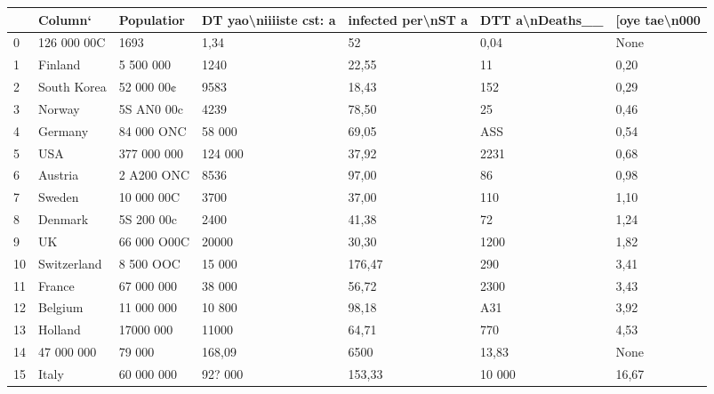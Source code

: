\begin{tabular}{lllllll}
\toprule
{} &      Column‘ &   Populatior & DT yao\textbackslash niiiiste cst: a & infected per\textbackslash nST a & DTT a\textbackslash nDeaths\_\_ & [oye tae\textbackslash n000 \\
\midrule
0  &  126 000 00C &         1693 &                   1,34 &                 52 &            0,04 &          None \\
1  &      Finland &    5 500 000 &                   1240 &              22,55 &              11 &          0,20 \\
2  &  South Korea &   52 000 00¢ &                   9583 &              18,43 &             152 &          0,29 \\
3  &       Norway &   5S AN0 00c &                   4239 &              78,50 &              25 &          0,46 \\
4  &      Germany &   84 000 ONC &                 58 000 &              69,05 &             ASS &          0,54 \\
5  &          USA &  377 000 000 &                124 000 &              37,92 &            2231 &          0,68 \\
6  &      Austria &   2 A200 ONC &                   8536 &              97,00 &              86 &          0,98 \\
7  &       Sweden &   10 000 00C &                   3700 &              37,00 &             110 &          1,10 \\
8  &      Denmark &   5S 200 00c &                   2400 &              41,38 &              72 &          1,24 \\
9  &           UK &  66 000 O00C &                  20000 &              30,30 &            1200 &          1,82 \\
10 &  Switzerland &    8 500 OOC &                 15 000 &             176,47 &             290 &          3,41 \\
11 &       France &   67 000 000 &                 38 000 &              56,72 &            2300 &          3,43 \\
12 &      Belgium &   11 000 000 &                 10 800 &              98,18 &             A31 &          3,92 \\
13 &      Holland &    17000 000 &                  11000 &              64,71 &             770 &          4,53 \\
14 &   47 000 000 &       79 000 &                 168,09 &               6500 &           13,83 &          None \\
15 &        Italy &   60 000 000 &                92? 000 &             153,33 &          10 000 &         16,67 \\
\bottomrule
\end{tabular}

